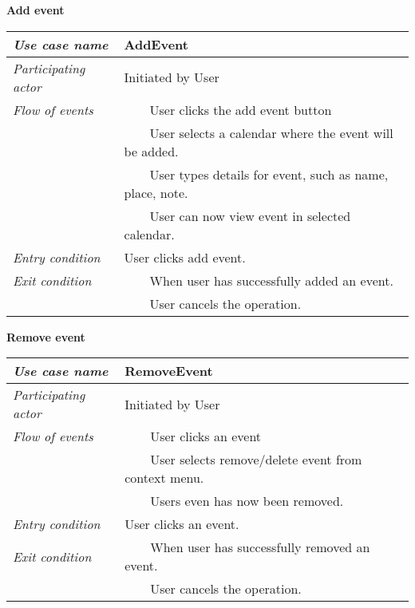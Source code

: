 \documentclass[10pt]{report}
\newcommand{\tabitem}{~~\llap{\textbullet}~~}
\numberwithin{equation}{section} %
\numberwithin{figure}{section} %
\numberwithin{table}{section} %
\begin{document}
\begin{table}[H]
\noindent \textbf{Add event}\\
\begin{tabularx}{\textwidth}{l X}
\midrule
\textit{Use case name} & AddEvent \\ \midrule
\textit{Participating actor} & Initiated by User \\ \midrule
\textit{Flow of events} & \tabitem User clicks the add event button\\
                                       & \tabitem User selects a calendar where
                                       the event will be added.\\
                                       & \tabitem User types details for event, such as
                                       name, place, note.\\
                                       & \tabitem User can now view event in selected calendar.\\
                        \midrule
\textit{Entry condition} & User clicks add event.\\ \midrule
\textit{Exit condition} & \tabitem When user has successfully added  an event. \\
						& \tabitem User cancels the operation.\\
                        \midrule
\end{tabularx}
\end{table}

\begin{table}[H]
\noindent \textbf{Remove event}\\
\begin{tabularx}{\textwidth}{l X}
\midrule
\textit{Use case name} & RemoveEvent \\ \midrule
\textit{Participating actor} & Initiated by User \\ \midrule
\textit{Flow of events} & \tabitem User clicks an event\\
                                       & \tabitem User selects remove/delete
                                       event from context menu.\\
                                       & \tabitem Users even has now been removed.\\
                        \midrule
\textit{Entry condition} & User clicks an event.\\ \midrule
\textit{Exit condition} & \tabitem When user has successfully removed an event. \\
						& \tabitem User cancels the operation.\\
                        \midrule
\end{tabularx}
\end{table}
\end{document}
